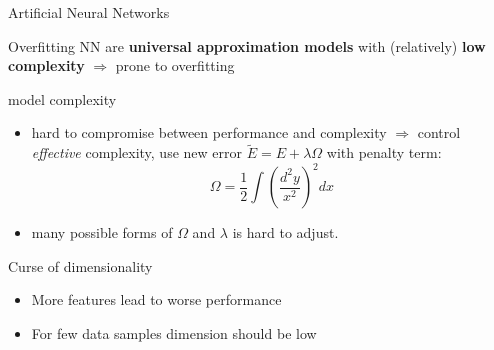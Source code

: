 \documentclass[9pt,t]{beamer}
\begin{document}
\begin{frame}{Artificial Neural Networks}
    \begin{alertblock}{Overfitting}
        NN are \textbf{universal approximation models} with (relatively) \textbf{low complexity} $ \Rightarrow $ prone to overfitting
    \end{alertblock}
    \begin{alertblock}{model complexity}
        \begin{itemize}
            \item hard to compromise between performance and complexity $ \Rightarrow  $ control \emph{effective} complexity, use new error $ \tilde{E} = E + \lambda \Omega $ with penalty term:
            \[ \Omega = \frac{1}{2} \int \left(\frac{d^2 y}{x^2}\right)^2 dx \]
            \item many possible forms of $ \Omega $ and $ \lambda $ is hard to adjust.
        \end{itemize}
    \end{alertblock}
    \begin{alertblock}{Curse of dimensionality}
        \begin{itemize}
            \item More features lead to worse performance
            \item For few data samples dimension should be low
        \end{itemize}
    \end{alertblock}
\end{frame}
\end{document}

